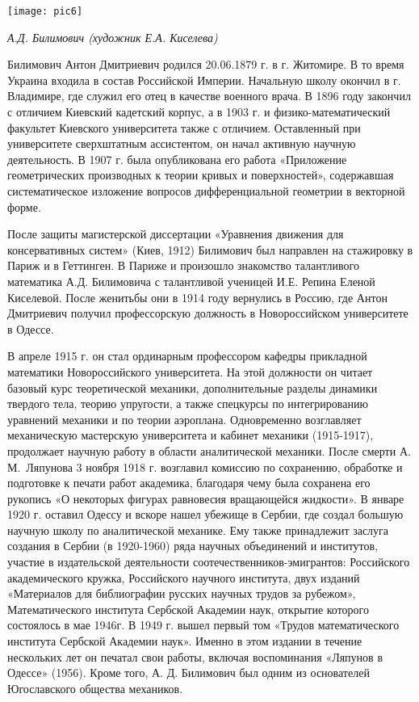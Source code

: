 \begin{center}
\texttt{[image: pic6]}

{\it А.Д. Билимович (художник Е.А. Киселева)}
\end{center}

Билимович Антон Дмитриевич родился 20.06.1879 г. в г. Житомире. В то время Украина входила в состав Российской Империи. Начальную школу окончил в г. Владимире, где служил его отец в качестве военного врача. В 1896 году закончил с отличием Киевский кадетский корпус, а в 1903 г. и физико-математический факультет Киевского университета также с отличием. Оставленный при университете сверхштатным ассистентом, он начал активную научную деятельность. В 1907 г. была опубликована его работа «Приложение геометрических производных к теории кривых и поверхностей», содержавшая систематическое изложение вопросов дифференциальной геометрии в векторной форме.

После защиты магистерской диссертации «Уравнения движения для консервативных систем» (Киев, 1912) Билимович был направлен на стажировку в Париж и в Геттинген. В Париже и произошло знакомство талантливого математика А.Д. Билимовича с талантливой ученицей И.Е. Репина Еленой Киселевой. После женитьбы они в 1914 году вернулись в Россию, где Антон Дмитриевич получил профессорскую должность в Новороссийском университете в Одессе.

В апреле 1915 г. он стал ординарным профессором кафедры прикладной математики Новороссийского университета. На этой должности он читает базовый курс теоретической механики, дополнительные разделы динамики твердого тела, теорию упругости, а также спецкурсы по интегрированию уравнений механики и по теории аэроплана. Одновременно возглавляет механическую мастерскую университета и кабинет механики (1915-1917), продолжает научную работу в области аналитической механики.
После смерти А.\,М.~Ляпунова 3 ноября 1918 г. возглавил комиссию по сохранению, обработке и подготовке к печати работ академика, благодаря чему была сохранена его рукопись «О некоторых фигурах равновесия вращающейся жидкости».
В январе 1920 г. оставил Одессу и вскоре нашел убежище в Сербии, где создал большую научную школу по аналитической механике. Ему также принадлежит заслуга создания в Сербии (в 1920-1960) ряда научных объединений и институтов, участие в издательской деятельности соотечественников-эмигрантов: Российского академического кружка, Российского научного института, двух изданий «Материалов для библиографии русских научных трудов за рубежом», Математического института Сербской Академии наук, открытие которого состоялось в мае 1946г. В 1949 г. вышел первый том «Трудов математического института Сербской Академии наук». Именно в этом издании в течение нескольких лет он печатал свои работы, включая воспоминания «Ляпунов в Одессе» (1956). Кроме того, А. Д. Билимович был одним из основателей Югославского общества механиков.

